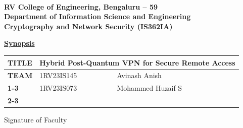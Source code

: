 \documentclass[12pt,a4paper]{article}
\newcommand{\synopsisTitle}{Hybrid Post-Quantum VPN for Secure Remote Access}
\begin{document}
\begin{center}
    \textbf{RV College of Engineering\textsuperscript{\textregistered}, Bengaluru -- 59}\\
    \textbf{Department of Information Science and Engineering}\\
    \textbf{Cryptography and Network Security (IS362IA)}

    \vspace{0.8cm}
    {\Large \textbf{\underline{Synopsis}}}
\end{center}

\vspace{0.5cm}

\begin{tabular}{|>{\bfseries}p{}|p{}|p{}|}
\hline
TITLE & \multicolumn{2}{p{0.72\textwidth}|}{\synopsisTitle} \\
\hline
TEAM & 1RV23IS145 & Avinash Anish \\
\cline{1-3}
& 1RV23IS073 & Mohammed Huzaif S \\
\cline{2-3}
\hline
\end{tabular}

\vspace{0.8cm}








\vspace{0.5cm}
\vfill
\begin{flushright}
    Signature of Faculty
\end{flushright}
\end{document}
